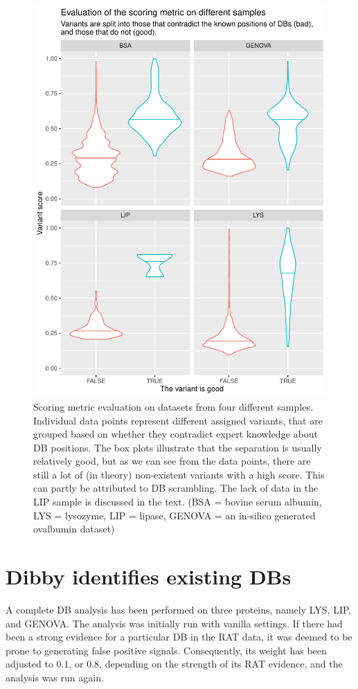 \begin{figure}
  \centering
  \includegraphics[width=0.85\linewidth]{img/scoring-metric-evaluation.pdf}
  \caption{Scoring metric evaluation on datasets from four different samples. Individual data points represent different assigned variants, that are grouped based on whether they contradict expert knowledge about DB positions. The box plots illustrate that the separation is usually relatively good, but as we can see from the data points, there are still a lot of (in theory) non-existent variants with a high score. This can partly be attributed to DB scrambling. The lack of data in the LIP sample is discussed in the text. (BSA = bovine serum albumin, LYS = lysozyme, LIP = lipase, GENOVA = an in-silico generated ovalbumin dataset)}\label{fig:scoring-metric}
\end{figure}

\section{Dibby identifies existing DBs}

A complete DB analysis has been performed on three proteins, namely LYS, LIP, and GENOVA\@. The analysis was initially run with vanilla settings. If there had been a strong evidence for a particular DB in the RAT data, it was deemed to be prone to generating false positive signals. Consequently, its weight has been adjusted to 0.1, or 0.8, depending on the strength of its RAT evidence, and the analysis was run again.


